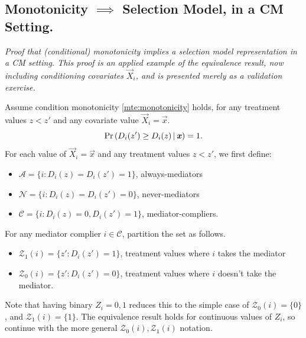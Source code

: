 
\subsection{Monotonicity $\implies$ Selection Model, in a CM Setting.}
\label{appendix:mte-monotonicity}
\textit{Proof that (conditional) monotonicity implies a selection model representation in a CM setting.
    This proof is an applied example of the \cite{vytlacil2002independence} equivalence result, now including conditioning covariates $\vec X_i$, and is presented merely as a validation exercise.
}

Assume condition monotonicity \ref{mte:monotonicity} holds, for any treatment values $z < z'$ and any covariate value $\vec X_i = \vec x$.
\[ \Pr\left( D_i(z') \geq D_i(z) \, \middle\vert \, \boldsymbol{\mathit{x}} \right) = 1. \]
For each value of $\vec{X}_i = \vec{x}$ and any treatment values $z < z'$, we first define:
\begin{itemize}
    \item $\mathcal{A} = \{i : D_i(z) = D_i(z') = 1\}$, always-mediators
    \item $\mathcal{N} = \{i : D_i(z) = D_i(z') = 0\}$, never-mediators
    \item $\mathcal{C} = \{i : D_i(z) = 0, D_i(z') = 1\}$, mediator-compliers.
\end{itemize}
For any mediator complier $i \in \mathcal C$, partition the set as follows.
\begin{itemize}
    \item $\mathcal{Z}_1(i) = \{z' : D_i(z') = 1\}$, treatment values where $i$ takes the mediator
    \item $\mathcal{Z}_0(i) = \{z' : D_i(z') = 0\}$, treatment values where $i$ doesn't take the mediator.
\end{itemize}
Note that having binary $Z_i = 0,1$ reduces this to the simple case of $\mathcal{Z}_0(i) = \{0\}$, and $\mathcal{Z}_1(i) = \{1\}$.
The equivalence result holds for continuous values of $Z_i$, so continue with the more general $\mathcal{Z}_0(i), \mathcal{Z}_1(i)$ notation.

